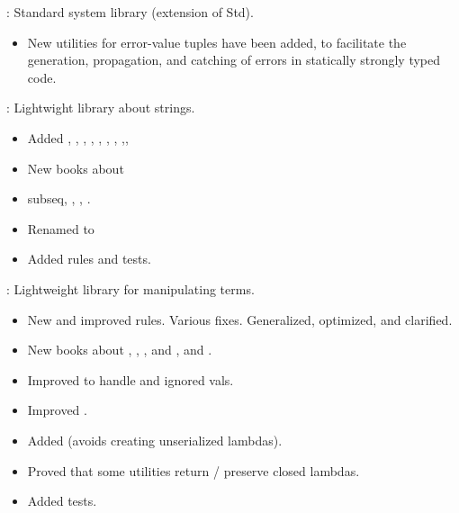 \begin{frame}

\implibtitle

:
Standard system library (extension of Std).
\begin{itemize}
\item New utilities for error-value tuples have been added,
      to facilitate the generation, propagation, and catching of errors
      in statically strongly typed code.
\end{itemize}

\end{frame}


\begin{frame}

\implibtitle

:
Lightwight library about strings.
\begin{itemize}
\item Added , ,
  , ,
  , ,
  ,
  ,,
\item New books about \item{subseq}, , , .
\item Renamed  to 
\item Added rules and tests.
\end{itemize}

\end{frame}


\begin{frame}

\implibtitle

:
Lightweight library for manipulating terms.
\begin{itemize}
\item New and improved rules. Various fixes. Generalized, optimized, and clarified.
\item New books about , , , and , and .
\item Improved  to handle  and ignored vals.
\item Improved .
\item Added  (avoids creating unserialized lambdas).
\item Proved that some utilities return / preserve closed lambdas.
\item Added tests.
\end{itemize}

\end{frame}

